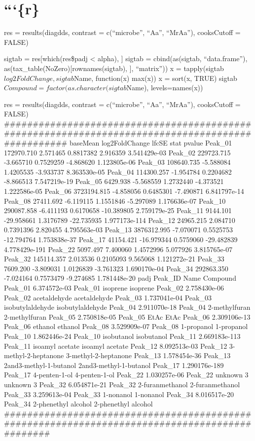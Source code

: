 \documentclass[]{article}
\begin{document}
\section{```\{r\}}\label{r-1}

res = results(diagdds, contrast = c(``microbe'', ``Aa'', ``MrAa''),
cooksCutoff = FALSE)

sigtab = res{[}which(res\$padj \textless{} alpha), {]} sigtab =
cbind(as(sigtab, ``data.frame''),
as(tax\_table(NoZero){[}rownames(sigtab), {]}, ``matrix'')) x =
tapply(sigtab\(log2FoldChange, sigtab\)Name, function(x) max(x)) x =
sort(x, TRUE) sigtab\(Compound = factor(as.character(sigtab\)Name),
levels=names(x))

res = results(diagdds, contrast = c(``microbe'', ``Aa'', ``MrAa''),
cooksCutoff = FALSE)
\#\#\#\#\#\#\#\#\#\#\#\#\#\#\#\#\#\#\#\#\#\#\#\#\#\#\#\#\#\#\#\#\#\#\#\#\#\#\#\#\#\#\#\#\#\#\#\#\#\#\#\#\#\#\#\#\#\#\#\#\#\#\#\#\#\#\#\#\#\#\#\#\#\#\#\#\#\#\#\#\#\#\#\#\#\#\#\#\#\#\#\#\#\#\#\#\#
baseMean log2FoldChange lfcSE stat pvalue Peak\_01 172970.710 2.571465
0.8817382 2.916359 3.541429e-03 Peak\_02 229723.715 -3.665710 0.7529259
-4.868620 1.123805e-06 Peak\_03 108640.735 -5.588084 1.4205535 -3.933737
8.363530e-05 Peak\_04 114300.257 -1.954784 0.2204682 -8.866513
7.547219e-19 Peak\_05 6429.938 -5.568559 1.2732440 -4.373521
1.222586e-05 Peak\_06 3723194.815 -4.858056 0.6485301 -7.490871
6.841797e-14 Peak\_08 27411.692 -6.119115 1.1551846 -5.297089
1.176636e-07 Peak\_10 290087.858 -6.411193 0.6170658 -10.389805
2.759179e-25 Peak\_11 9144.101 -29.958661 1.3176789 -22.735935
1.977173e-114 Peak\_12 24965.215 2.084710 0.7391396 2.820455
4.795563e-03 Peak\_13 3876312.995 -7.070071 0.5525753 -12.794764
1.753838e-37 Peak\_17 41154.421 -16.979344 0.5759060 -29.482839
4.778429e-191 Peak\_22 5097.497 7.400060 1.4572996 5.077926 3.815765e-07
Peak\_32 145114.357 2.013536 0.2105093 9.565068 1.121272e-21 Peak\_33
7609.200 -3.809031 1.0126839 -3.761323 1.690170e-04 Peak\_34 292863.350
-7.024164 0.7573479 -9.274685 1.781448e-20 padj Peak\_ID Name Compound
Peak\_01 6.374572e-03 Peak\_01 isoprene isoprene Peak\_02 2.758430e-06
Peak\_02 acetaldehyde acetaldehyde Peak\_03 1.737041e-04 Peak\_03
isobutylaldehyde isobutylaldehyde Peak\_04 2.911070e-18 Peak\_04
2-methylfuran 2-methylfuran Peak\_05 2.750818e-05 Peak\_05 EtAc EtAc
Peak\_06 2.309106e-13 Peak\_06 ethanol ethanol Peak\_08 3.529909e-07
Peak\_08 1-propanol 1-propanol Peak\_10 1.862446e-24 Peak\_10 isobutanol
isobutanol Peak\_11 2.669183e-113 Peak\_11 isoamyl acetate isoamyl
acetate Peak\_12 8.092513e-03 Peak\_12 3-methyl-2-heptanone
3-methyl-2-heptanone Peak\_13 1.578454e-36 Peak\_13
2and3-methyl-1-butanol 2and3-methyl-1-butanol Peak\_17 1.290176e-189
Peak\_17 4-penten-1-ol 4-penten-1-ol Peak\_22 1.030257e-06 Peak\_22
unknown 3 unknown 3 Peak\_32 6.054871e-21 Peak\_32 2-furanmethanol
2-furanmethanol Peak\_33 3.259613e-04 Peak\_33 1-nonanol 1-nonanol
Peak\_34 8.016517e-20 Peak\_34 2-phenethyl alcohol 2-phenethyl alcohol
\#\#\#\#\#\#\#\#\#\#\#\#\#\#\#\#\#\#\#\#\#\#\#\#\#\#\#\#\#\#\#\#\#\#\#\#\#\#\#\#\#\#\#\#\#\#\#\#\#\#\#\#\#\#\#\#\#\#\#\#\#\#\#\#\#\#\#\#\#\#\#\#\#\#\#\#\#\#\#\#\#\#\#\#\#\#\#\#\#\#\#\#\#\#
\end{document}
